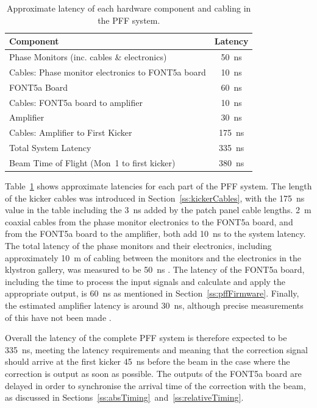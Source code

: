\begin{table}
  \begin{center}
    \begin{tabular}{| l c |}
	   \hline
       Component & Latency \\ \hline
       Phase Monitors (inc. cables \& electronics) & 50~ns \\
	   Cables: Phase monitor electronics to FONT5a board & 10~ns \\
	   FONT5a Board & 60~ns \\
	   Cables: FONT5a board to amplifier & 10~ns \\
	   Amplifier & 30~ns \\
	   Cables: Amplifier to First Kicker & 175~ns \\ \hline
	   Total System Latency & 335~ns \\
	   Beam Time of Flight (Mon~1 to first kicker) & 380~ns \\ \hline   
    \end{tabular}
    \caption{Approximate latency of each hardware component and cabling in the PFF system.}
  	\label{t:systLatency}
  \end{center}
\end{table}


Table~\ref{t:systLatency} shows approximate latencies for each part of the PFF system. The length of the kicker cables was introduced in Section~\ref{ss:kickerCables}, with the 175~ns value in the table including the 3~ns added by the patch panel cable lengths. 2~m coaxial cables from the phase monitor electronics to the FONT5a board, and from the FONT5a board to the amplifier, both add 10~ns to the system latency. The total latency of the phase monitors and their electronics, including approximately 10~m of cabling between the monitors and the electronics in the klystron gallery, was measured to be 50~ns \cite{alexPriv}. The latency of the FONT5a board, including the time to process the input signals and calculate and apply the appropriate output, is 60~ns as mentioned in Section~\ref{ss:pffFirmware}. Finally, the estimated amplifier latency is around 30~ns, although precise measurements of this have not been made \cite{colinPriv}.

Overall the latency of the complete PFF system is therefore expected to be 335~ns, meeting the latency requirements and meaning that the correction signal should arrive at the first kicker 45~ns before the beam in the case where the correction is output as soon as possible. The outputs of the FONT5a board are delayed in order to synchronise the arrival time of the correction with the beam, as discussed in Sections~\ref{ss:absTiming}~and~\ref{ss:relativeTiming}.

